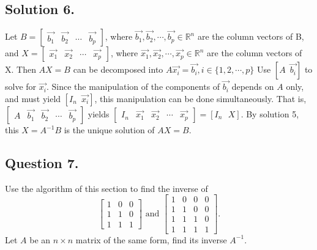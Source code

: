 \documentclass{article}
\begin{document}
\subsection*{Solution 6.}
Let $B=[\begin{array}{cccc}\Vec{b_1}&\Vec{b_2}&\cdots&\Vec{b_p}\end{array}]$, where $\Vec{b_1},\Vec{b_2},\cdots,\Vec{b_p}\in\mathbb{R}^n$ are the column vectors of B,
and $X=[\begin{array}{cccc}\Vec{x_1}&\Vec{x_2}&\cdots&\Vec{x_p}\end{array}]$, where $\Vec{x_1},\Vec{x_2},\cdots,\Vec{x_p}\in\mathbb{R}^n$ are the column vectors of X. 
Then $AX=B$ can be decomposed into  $A\Vec{x_i}=\Vec{b_i},i\in\{1,2,\cdots,p\}$\newline
Use $[A\,\,\,\Vec{b_i}]$ to solve for $\Vec{x_i}$. Since the manipulation of the components of $\Vec{b_i}$ depends on $A$ only, and must yield $[I_n\,\,\,\vec{x_i}]$, this manipulation can be done simultaneously. That is, $[\begin{array}{ccccc}A&\vec{b_1}&\vec{b_2}&\cdots&\vec{b_p}\end{array}]$ yields $[\begin{array}{ccccc}I_n&\vec{x_1}&\vec{x_2}&\cdots&\vec{x_p}\end{array}]=[I_n\,\,\,\,X]$. By solution 5, this $X=A^{-1}B$ is the unique solution of $AX=B$.
\subsection*{Question 7.}
Use the algorithm of this section to find the inverse of 
\[\left[\begin{array}{ccc}1&0&0\\1&1&0\\1&1&1\end{array}\right]\text{ and }\left[\begin{array}{cccc}1&0&0&0\\1&1&0&0\\1&1&1&0\\1&1&1&1\end{array}\right].\]
Let $A$ be an $n \times n$ matrix of the same form, find its inverse $A^{-1}$.
\end{document}
